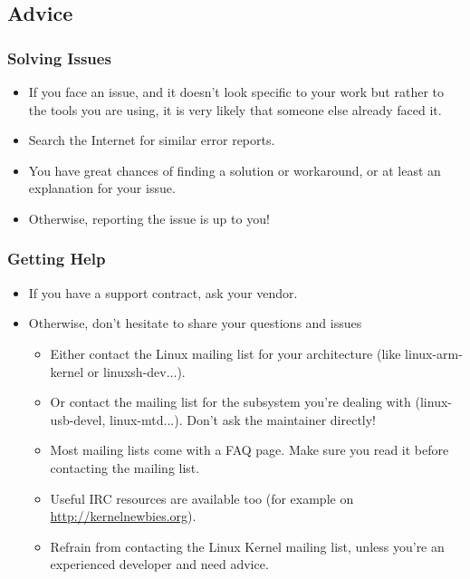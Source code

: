 \subsection{Advice}

\begin{frame}
  \frametitle{Solving Issues}
  \begin{itemize}
  \item If you face an issue, and it doesn't look specific to your
    work but rather to the tools you are using, it is very likely that
    someone else already faced it.
  \item Search the Internet for similar error reports.
  \item You have great chances of finding a solution or workaround, or
    at least an explanation for your issue.
  \item Otherwise, reporting the issue is up to you!
  \end{itemize}
\end{frame}

\begin{frame}
  \frametitle{Getting Help}
  \begin{itemize}
  \item If you have a support contract, ask your vendor.
  \item Otherwise, don't hesitate to share your questions and issues
    \begin{itemize}
    \item Either contact the Linux mailing list for your architecture
      (like linux-arm-kernel or linuxsh-dev...).
    \item Or contact the mailing list for the subsystem you're dealing
      with (linux- usb-devel, linux-mtd...). Don't ask the maintainer
      directly!
    \item Most mailing lists come with a FAQ page. Make sure you read
      it before contacting the mailing list.
    \item Useful IRC resources are available too
      (for example on \url{http://kernelnewbies.org}).
    \item Refrain from contacting the Linux Kernel mailing list,
      unless you're an experienced developer and need advice.
    \end{itemize}
  \end{itemize}
\end{frame}

